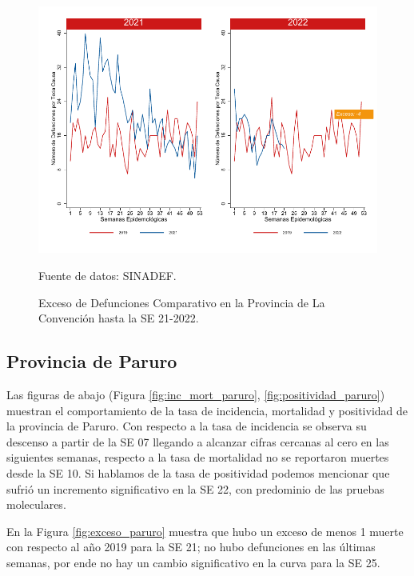 \documentclass[12pt,a4paper,openany]{book}
\begin{document}
	\begin{figure}[h]
		\caption{Exceso de Defunciones Comparativo en la Provincia de La Convención hasta la SE 21-2022.}\label{fig:exceso_laconv}
		\begin{center}
			\includegraphics[width=0.7\linewidth]{../figuras/exceso_9.pdf}
		\end{center}
		{\footnotesize {Fuente de datos: SINADEF.}}
	\end{figure}
	
	\clearpage
	
	\subsection*{Provincia de Paruro}
	\noindent Las figuras de abajo (Figura \ref{fig:inc_mort_paruro}, \ref{fig:positividad_paruro}) muestran el comportamiento de la tasa de incidencia, mortalidad y positividad de la provincia de Paruro. Con respecto a la tasa de incidencia se observa su descenso a partir de la SE 07 llegando a alcanzar cifras cercanas al cero en las siguientes semanas, respecto a la tasa de mortalidad no se reportaron muertes desde la SE 10. Si hablamos de la tasa de positividad podemos mencionar que sufrió un incremento significativo en la SE 22, con predominio de las pruebas moleculares.
	
	En la Figura \ref{fig:exceso_paruro} muestra que hubo un exceso de menos 1 muerte con respecto al año 2019 para la SE 21; no hubo defunciones en las últimas semanas, por ende no hay un cambio significativo en la curva para la SE 25.
	
\end{document}
